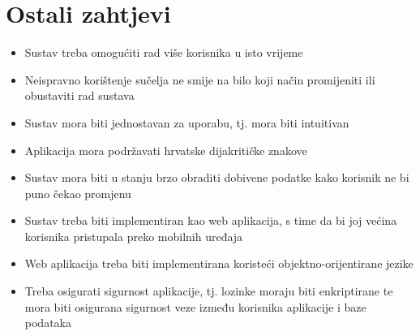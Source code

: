 		\section{Ostali zahtjevi}
			 \begin{itemize}
			 	\item  Sustav treba omogućiti rad više korisnika u isto vrijeme
			 	\item  Neispravno korištenje sučelja ne smije na bilo koji način promijeniti ili obustaviti rad sustava
			 	\item  Sustav mora biti jednostavan za uporabu, tj. mora biti intuitivan
			 	\item Aplikacija mora podržavati hrvatske dijakritičke znakove
			 	\item  Sustav mora biti u stanju brzo obraditi dobivene podatke kako korisnik ne bi puno čekao promjenu
			 	\item  Sustav treba biti implementiran kao web aplikacija, s time da bi joj većina korisnika pristupala preko mobilnih uređaja
			 	\item Web aplikacija treba biti implementirana koristeći objektno-orijentirane jezike
			 	\item  Treba osigurati sigurnost aplikacije, tj. lozinke moraju biti enkriptirane te mora biti osigurana sigurnost veze između korisnika aplikacije i baze podataka 
			 \end{itemize}